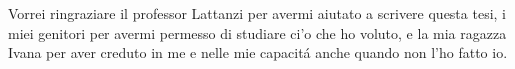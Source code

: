 \documentclass[a4paper,singleside,11pt]{report}
\begin{document}

\copertinatesi 
{}
\indice
\indicefigure
\iniziatesto







\appendix
%


\ringraziamenti
Vorrei ringraziare il professor Lattanzi per avermi aiutato a scrivere questa tesi, i miei genitori per avermi permesso di studiare ci'o che ho voluto, e la mia ragazza Ivana per aver creduto in me e nelle mie capacit\'a anche quando non l'ho fatto io.
\end{document}
